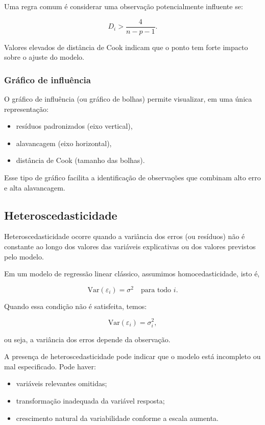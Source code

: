 \documentclass{article}
\begin{document}
Uma regra comum é considerar uma observação potencialmente
influente se:

\[
D_i > \frac{4}{n - p - 1}.
\]

Valores elevados de distância de Cook indicam que o ponto tem forte
impacto sobre o ajuste do modelo.

\subsubsection{Gráfico de influência}

O gráfico de influência (ou gráfico de bolhas) permite visualizar,
em uma única representação:

\begin{itemize}
    \item resíduos padronizados (eixo vertical),
    \item alavancagem (eixo horizontal),
    \item distância de Cook (tamanho das bolhas).
\end{itemize}

Esse tipo de gráfico facilita a identificação de observações que
combinam alto erro e alta alavancagem.

\subsection{Heteroscedasticidade}

Heteroscedasticidade ocorre quando a variância dos erros (ou resíduos)
não é constante ao longo dos valores das variáveis explicativas
ou dos valores previstos pelo modelo.

Em um modelo de regressão linear clássico, assumimos homocedasticidade,
isto é,

\[
\mathrm{Var}(\varepsilon_i) = \sigma^2 \quad \text{para todo } i.
\]

Quando essa condição não é satisfeita, temos:

\[
\mathrm{Var}(\varepsilon_i) = \sigma_i^2,
\]

ou seja, a variância dos erros depende da observação.

A presença de heteroscedasticidade pode indicar que o modelo está
incompleto ou mal especificado. Pode haver:

\begin{itemize}
    \item variáveis relevantes omitidas;
    \item transformação inadequada da variável resposta;
    \item crescimento natural da variabilidade conforme a escala aumenta.
\end{itemize}
\end{document}

